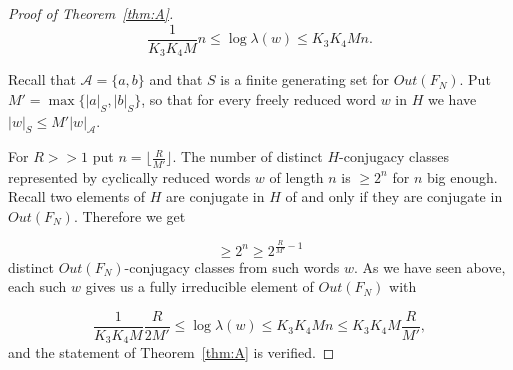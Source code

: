 \documentclass[11pt,letterpaper]{amsart}
\theoremstyle{definition}
\theoremstyle{remark}
\begin{document}
\begin{proof}[Proof of Theorem~\ref{thm:A}]
\[
\frac{1}{K_3K_4M}n\le \log\lambda(w) \le K_3K_4Mn.
\]

Recall that $\mathcal A=\{a,b\}$ and that $S$ is a finite generating set for $Out(F_N)$. Put $M'=\max\{|a|_S,|b|_S\}$, so that for every freely reduced word $w$ in $H$ we have $|w|_S\le M'|w|_\mathcal A$. 

For $R>> 1$ put $n=\lfloor \frac{R}{M'}\rfloor$.  The number of distinct $H$-conjugacy classes represented by cyclically reduced words $w$ of length $n$ is $\ge 2^n$ for $n$ big enough. 
Recall two elements of $H$ are conjugate in $H$ of and only if they are conjugate in $Out(F_N)$.  Therefore we get

\[
\ge 2^n\ge 2^{ \frac{R}{M'}-1}
\] distinct $Out(F_N)$-conjugacy classes from such words $w$.  As we have seen above, each such $w$ gives us a fully irreducible element of $Out(F_N)$ with 

\[
\frac{1}{K_3K_4M}\frac{R}{2M'}\le \log\lambda(w) \le K_3K_4Mn\le K_3K_4M \frac{R}{M'},
\] 
and the statement of Theorem~\ref{thm:A} is verified.
\end{proof}
\end{document}
